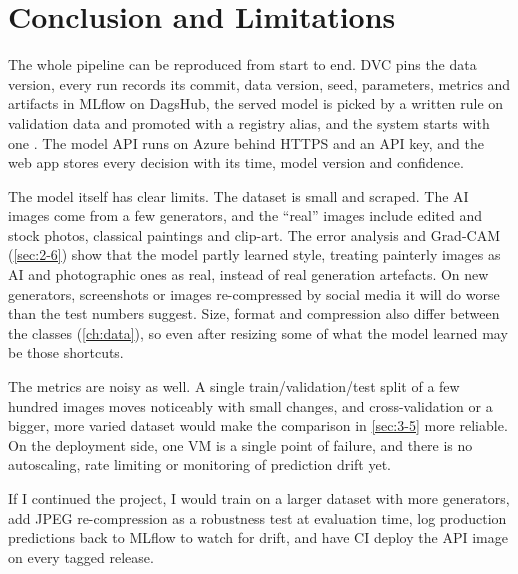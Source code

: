 \chapter{Conclusion and Limitations}

The whole pipeline can be reproduced from start to end. DVC pins the data version, every run
records its commit, data version, seed, parameters, metrics and artifacts in MLflow on DagsHub, the
served model is picked by a written rule on validation data and promoted with a registry alias, and
the system starts with one . The model API runs on Azure behind HTTPS and an
API key, and the web app stores every decision with its time, model version and confidence.

The model itself has clear limits. The dataset is small and scraped. The AI images come from a few
generators, and the ``real'' images include edited and stock photos, classical paintings and
clip-art. The error analysis and Grad-CAM (\cref{sec:2-6}) show that the model partly learned
style, treating painterly images as AI and photographic ones as real, instead of real generation
artefacts. On new generators, screenshots or images re-compressed by social media it will do worse
than the test numbers suggest. Size, format and compression also differ between the classes
(\cref{ch:data}), so even after resizing some of what the model learned may be those shortcuts.

The metrics are noisy as well. A single train/validation/test split of a few hundred images moves
noticeably with small changes, and cross-validation or a bigger, more varied dataset would make the
comparison in \cref{sec:3-5} more reliable. On the deployment side, one VM is a single point of
failure, and there is no autoscaling, rate limiting or monitoring of prediction drift yet.

If I continued the project, I would train on a larger dataset with more generators, add JPEG
re-compression as a robustness test at evaluation time, log production predictions back to MLflow
to watch for drift, and have CI deploy the API image on every tagged release.
